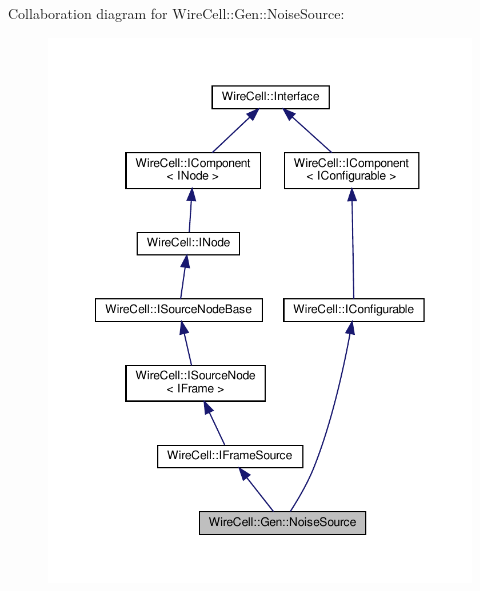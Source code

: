 Collaboration diagram for Wire\+Cell\+:\+:Gen\+:\+:Noise\+Source\+:
\nopagebreak
\begin{figure}[H]
\begin{center}
\leavevmode
\includegraphics[width=350pt]{class_wire_cell_1_1_gen_1_1_noise_source__coll__graph}
\end{center}
\end{figure}
